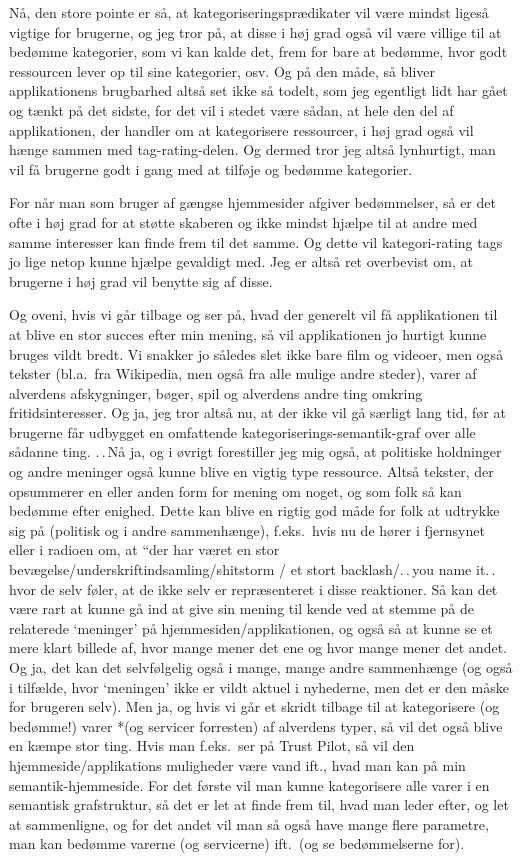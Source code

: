 \documentclass{report}
\begin{document}
Nå, den store pointe er så, at kategoriseringsprædikater vil være mindst ligeså vigtige for brugerne, og jeg tror på, at disse i høj grad også vil være villige til at bedømme kategorier, som vi kan kalde det, frem for bare at bedømme, hvor godt ressourcen lever op til sine kategorier, osv. Og på den måde, så bliver applikationens brugbarhed altså set ikke så todelt, som jeg egentligt lidt har gået og tænkt på det sidste, for det vil i stedet være sådan, at hele den del af applikationen, der handler om at kategorisere ressourcer, i høj grad også vil hænge sammen med tag-rating-delen. Og dermed tror jeg altså lynhurtigt, man vil få brugerne godt i gang med at tilføje og bedømme kategorier. 

For når man som bruger af gængse hjemmesider afgiver bedømmelser, så er det ofte i høj grad for at støtte skaberen og ikke mindst hjælpe til at andre med samme interesser kan finde frem til det samme. Og dette vil kategori-rating tags jo lige netop kunne hjælpe gevaldigt med. Jeg er altså ret overbevist om, at brugerne i høj grad vil benytte sig af disse.

Og oveni, hvis vi går tilbage og ser på, hvad der generelt vil få applikationen til at blive en stor succes efter min mening, så vil applikationen jo hurtigt kunne bruges vildt bredt. Vi snakker jo således slet ikke bare film og videoer, men også tekster (bl.a.\ fra Wikipedia, men også fra alle mulige andre steder), varer af alverdens afskygninger, bøger, spil og alverdens andre ting omkring fritidsinteresser. Og ja, jeg tror altså nu, at der ikke vil gå særligt lang tid, før at brugerne får udbygget en omfattende kategoriserings-semantik-graf over alle sådanne ting. .\,.\,Nå ja, og i øvrigt forestiller jeg mig også, at politiske holdninger og andre meninger også kunne blive en vigtig type ressource. Altså tekster, der opsummerer en eller anden form for mening om noget, og som folk så kan bedømme efter enighed. Dette kan blive en rigtig god måde for folk at udtrykke sig på (politisk og i andre sammenhænge), f.eks.\ hvis nu de hører i fjernsynet eller i radioen om, at ``der har været en stor bevægelse/underskriftindsamling/shitstorm / et stort backlash/.\,.\,you name it.\,. hvor de selv føler, at de ikke selv er repræsenteret i disse reaktioner. Så kan det være rart at kunne gå ind at give sin mening til kende ved at stemme på de relaterede `meninger' på hjemmesiden/applikationen, og også så at kunne se et mere klart billede af, hvor mange mener det ene og hvor mange mener det andet. Og ja, det kan det selvfølgelig også i mange, mange andre sammenhænge (og også i tilfælde, hvor `meningen' ikke er vildt aktuel i nyhederne, men det er den måske for brugeren selv). Men ja, og hvis vi går et skridt tilbage til at kategorisere (og bedømme!) varer *(og servicer forresten) af alverdens typer, så vil det også blive en kæmpe stor ting. Hvis man f.eks.\ ser på Trust Pilot, så vil den hjemmeside/applikations muligheder være vand ift., hvad man kan på min semantik-hjemmeside. For det første vil man kunne kategorisere alle varer i en semantisk grafstruktur, så det er let at finde frem til, hvad man leder efter, og let at sammenligne, og for det andet vil man så også have mange flere parametre, man kan bedømme varerne (og servicerne) ift.\ (og se bedømmelserne for). 
\end{document}
